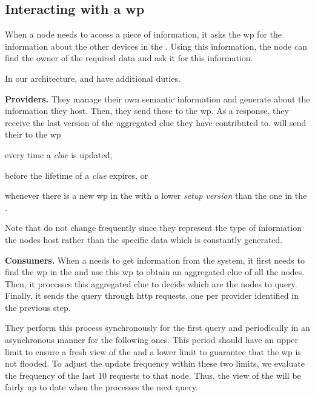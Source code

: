 \subsection{Interacting with a \acl{wp}}
\label{sec:interacting}
When a node needs to access a piece of information, it asks the \ac{wp} for the information about the other devices in the \Space{}.
Using this information, the node can find the owner of the required data and ask it for this information.

In our architecture, \providers{} and \consumers{} have additional duties.

\noindent\textbf{Providers.}
They manage their own semantic information and generate \clues{} about the information they host.
Then, they send these \clues{} to the \Space{} \ac{wp}.
As a response, they receive the last version of the aggregated clue they have contributed to.
\providers{} will send their \clues{} to the \ac{wp}
\begin{enumerate*}[label=\itshape(\arabic*\upshape)]
  \item every time a \emph{clue} is updated,
  \item before the lifetime of a \emph{clue} expires, or
  \item whenever there is a new \ac{wp} in the \Space{} with a lower \emph{setup version} than the one in the \provider{}.
\end{enumerate*}
Note that \clues{} do not change frequently since they represent the type of information the nodes host rather than the specific data which is constantly generated.

\noindent\textbf{Consumers.}
When a \consumer{} needs to get information from the system, it first needs to find the \ac{wp} in the \Space{} and use this \ac{wp} to obtain an aggregated clue of all the nodes.
Then, it processes this aggregated clue to decide which are the nodes to query.
Finally, it sends the query through \acs{http} requests, one per provider identified in the previous step.

They perform this process synchronously for the first query and periodically in an asynchronous manner for the following ones.
This period should have an upper limit to ensure a fresh view of the \Space{} and a lower limit to guarantee that the \ac{wp} is not flooded.
To adjust the update frequency within these two limits, we evaluate the frequency of the last 10 requests to that node.
Thus, the view of the \Space{} will be fairly up to date when the \consumer{} processes the next query.

